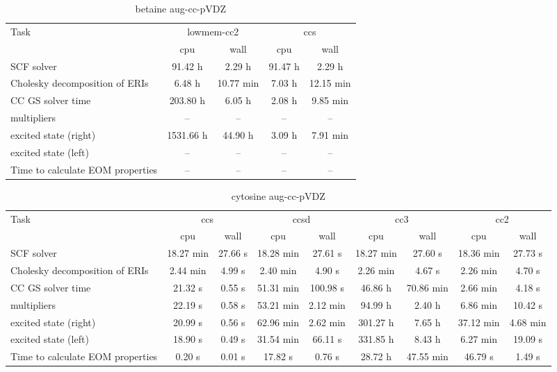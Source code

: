 \documentclass{article}
\begin{document}
\begin{table}
\caption{betaine aug-cc-pVDZ}
\begin{tabular}{lcccc}
\toprule
Task & \multicolumn{2}{c}{lowmem-cc2} & \multicolumn{2}{c}{ccs}\\
\cmidrule(lr){2-3}\cmidrule(lr){4-5}
 & cpu & wall & cpu & wall\\
\midrule
SCF solver & 91.42 h & 2.29 h & 91.47 h & 2.29 h\\
Cholesky decomposition of ERIs & 6.48 h & 10.77 min & 7.03 h & 12.15 min\\
CC GS solver time & 203.80 h & 6.05 h & 2.08 h & 9.85 min\\
multipliers & -- & -- & -- & --\\
excited state (right) & 1531.66 h & 44.90 h & 3.09 h & 7.91 min\\
excited state (left) & -- & -- & -- & --\\
Time to calculate EOM properties & -- & -- & -- & --\\
\bottomrule
\end{tabular}
\end{table}
\begin{table}
\caption{cytosine aug-cc-pVDZ}
\begin{tabular}{lcccccccc}
\toprule
Task & \multicolumn{2}{c}{ccs} & \multicolumn{2}{c}{ccsd} & \multicolumn{2}{c}{cc3} & \multicolumn{2}{c}{cc2}\\
\cmidrule(lr){2-3}\cmidrule(lr){4-5}\cmidrule(lr){6-7}\cmidrule(lr){8-9}
 & cpu & wall & cpu & wall & cpu & wall & cpu & wall\\
\midrule
SCF solver & 18.27 min & 27.66 s & 18.28 min & 27.61 s & 18.27 min & 27.60 s & 18.36 min & 27.73 s\\
Cholesky decomposition of ERIs & 2.44 min & 4.99 s & 2.40 min & 4.90 s & 2.26 min & 4.67 s & 2.26 min & 4.70 s\\
CC GS solver time & 21.32 s & 0.55 s & 51.31 min & 100.98 s & 46.86 h & 70.86 min & 2.66 min & 4.18 s\\
multipliers & 22.19 s & 0.58 s & 53.21 min & 2.12 min & 94.99 h & 2.40 h & 6.86 min & 10.42 s\\
excited state (right) & 20.99 s & 0.56 s & 62.96 min & 2.62 min & 301.27 h & 7.65 h & 37.12 min & 4.68 min\\
excited state (left) & 18.90 s & 0.49 s & 31.54 min & 66.11 s & 331.85 h & 8.43 h & 6.27 min & 19.09 s\\
Time to calculate EOM properties & 0.20 s & 0.01 s & 17.82 s & 0.76 s & 28.72 h & 47.55 min & 46.79 s & 1.49 s\\
\bottomrule
\end{tabular}
\end{table}
\end{document}

